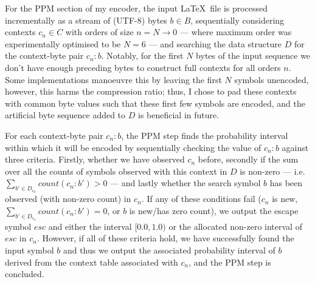 \documentclass[a4paper, 11pt]{article}
\begin{document}
For the PPM section of my encoder, the input \LaTeX\ file is processed incrementally as a stream of (UTF-8) bytes $b \in B$, sequentially considering contexts $c_{n} \in C$ with orders of size $n = N \to 0$ --- where maximum order was experimentally optimised to be $N = 6$ --- and searching the data structure $D$ for the context-byte pair $c_{n} \colon b$. Notably, for the first $N$ bytes of the input sequence we don’t have enough preceding bytes to construct full contexts for all orders $n$. Some implementations manoeuvre this by leaving the first $N$ symbols unencoded, however, this harms the compression ratio; thus, I chose to pad these contexts with common byte values such that these first few symbols are encoded, and the artificial byte sequence added to $D$ is beneficial in future.

For each context-byte pair $c_{n} \colon b$, the PPM step finds the probability interval within which it will be encoded by sequentially checking the value of $c_{n} \colon b$ against three criteria. Firstly, whether we have observed $c_{n}$ before, secondly if the sum over all the counts of symbols observed with this context in $D$ is non-zero --- i.e. $\sum_{b' \in D_{c_{n}}} count(c_{n} \colon b') > 0$ --- and lastly whether the search symbol $b$ has been observed (with non-zero count) in $c_{n}$. If any of these conditions fail ($c_{n}$ is new, $\sum_{b' \in D_{c_{n}}} count(c_{n} \colon b') = 0$, or $b$ is new/has zero count), we output the escape symbol $esc$ and either the interval $[0.0, 1.0)$ or the allocated non-zero interval of $esc$ in $c_{n}$. However, if all of these criteria hold, we have successfully found the input symbol $b$ and thus we output the associated probability interval of $b$ derived from the context table associated with $c_{n}$, and the PPM step is concluded.
\end{document}
